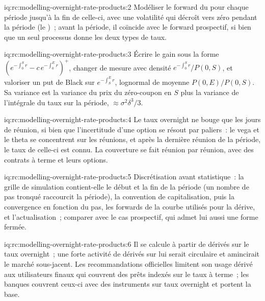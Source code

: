 \begin{solution}{iq:rc:modelling-overnight-rate-products:2}
Modéliser le forward du  pour chaque période jusqu'à la
fin de celle-ci, avec une volatilité qui décroît vers zéro pendant la période (le )~; avant la période, il coïncide avec le forward prospectif, si bien que
un seul processus donne les deux types de taux.
\end{solution}

\begin{solution}{iq:rc:modelling-overnight-rate-products:3}
Écrire le gain sous la forme $(e^{-\int_0^Sr}-c\,e^{-\int_0^Er})^+$, changer de mesure avec
densité $e^{-\int_0^Sr}/P(0,S)$, et valoriser un put de Black sur $e^{-\int_S^Er}$, lognormal de
moyenne $P(0,E)/P(0,S)$. Sa variance est la variance du prix du zéro-coupon en $S$ plus la
variance de l'intégrale du taux sur la période, $\approx\sigma^2\delta^3/3$.
\end{solution}

\begin{solution}{iq:rc:modelling-overnight-rate-products:4}
Le taux overnight ne bouge que les jours de réunion, si bien que l'incertitude d'une option se
résout par paliers~: le vega et le theta se concentrent sur les réunions, et après la dernière
réunion de la période, le taux de celle-ci est connu. La couverture se fait réunion par réunion, avec des contrats à terme et leurs options.
\end{solution}

\begin{solution}{iq:rc:modelling-overnight-rate-products:5}
Discrétisation avant statistique~: la grille de simulation contient-elle le début et la
fin de la période (un nombre de pas tronqué raccourcit la période), la convention de
capitalisation, puis la convergence en fonction du pas, les forwards de la courbe utilisés pour la
dérive, et l'actualisation~; comparer avec le cas prospectif, qui admet lui aussi une
forme fermée.
\end{solution}

\begin{solution}{iq:rc:modelling-overnight-rate-products:6}
Il se calcule à partir de dérivés sur le taux overnight~; une forte activité de dérivés sur lui
serait circulaire et amincirait le marché sous-jacent. Les recommandations officielles limitent son usage
dérivé aux utilisateurs finaux qui couvrent des prêts indexés sur le taux à terme~; les banques couvrent ceux-ci avec des
instruments sur taux overnight et portent la base.
\end{solution}
